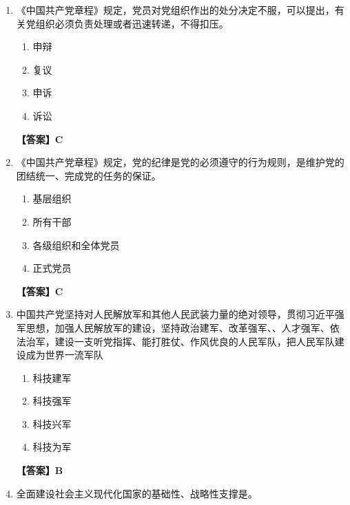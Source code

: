 \documentclass[UTF8,11pt,a4paper]{ctexart}
\begin{document}
\begin{enumerate}[label=\textbf{\arabic*.}, leftmargin=2.5em, itemsep=0.7em]
\begin{enumerate}[label=\Alph*., leftmargin=2em, itemsep=0.1em, topsep=0.15em]
\item 开除
\item 罢免
\item 辞退
\item 处分
\end{enumerate}
\textbf{【答案】B}
\item 《中国共产党章程》规定，党员对党组织作出的处分决定不服，可以提出\allowbreak\underline{\hspace{4em}}，有关党组织必须负责处理或者迅速转递，不得扣压。
\begin{enumerate}[label=\Alph*., leftmargin=2em, itemsep=0.1em, topsep=0.15em]
\item 申辩
\item 复议
\item 申诉
\item 诉讼
\end{enumerate}
\textbf{【答案】C}
\item 《中国共产党章程》规定，党的纪律是党的\allowbreak\underline{\hspace{4em}}必须遵守的行为规则，是维护党的团结统一、完成党的任务的保证。
\begin{enumerate}[label=\Alph*., leftmargin=2em, itemsep=0.1em, topsep=0.15em]
\item 基层组织
\item 所有干部
\item 各级组织和全体党员
\item 正式党员
\end{enumerate}
\textbf{【答案】C}
\item 中国共产党坚持对人民解放军和其他人民武装力量的绝对领导，贯彻习近平强军思想，加强人民解放军的建设，坚持政治建军、改革强军、\allowbreak\underline{\hspace{4em}}、人才强军、依法治军，建设一支听党指挥、能打胜仗、作风优良的人民军队，把人民军队建设成为世界一流军队
\begin{enumerate}[label=\Alph*., leftmargin=2em, itemsep=0.1em, topsep=0.15em]
\item 科技建军
\item 科技强军
\item 科技兴军
\item 科技为军
\end{enumerate}
\textbf{【答案】B}
\item 全面建设社会主义现代化国家的基础性、战略性支撑是\allowbreak\underline{\hspace{4em}}。
\begin{enumerate}[label=\Alph*., leftmargin=2em, itemsep=0.1em, topsep=0.15em]

\end{enumerate}
\end{enumerate}
\end{document}
